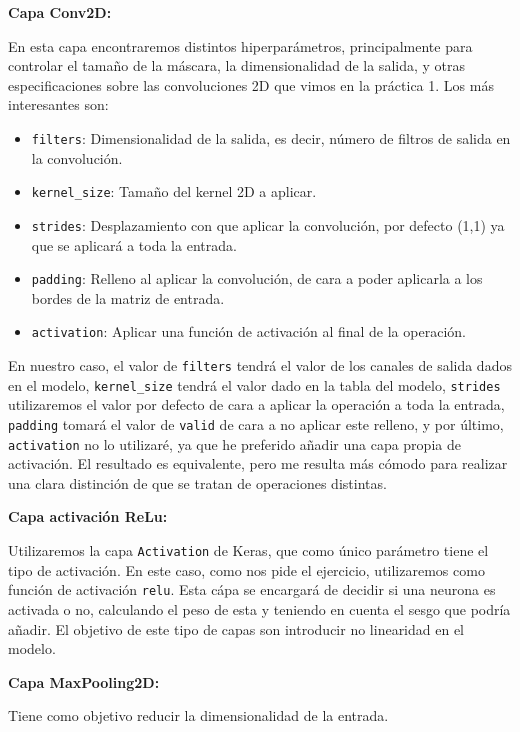 \documentclass[12pt, spanish]{article}
\begin{document}
\textbf{Capa Conv2D:}

En esta capa encontraremos distintos hiperparámetros, principalmente para controlar el tamaño de la máscara, la dimensionalidad de la salida, y otras especificaciones sobre las convoluciones 2D que vimos en la práctica 1. Los más interesantes son:

\begin{itemize}
	\item \texttt{filters}: Dimensionalidad de la salida, es decir, número de filtros de salida en la convolución.
	\item \texttt{kernel\_size}: Tamaño del kernel 2D a aplicar.
	\item \texttt{strides}: Desplazamiento con que aplicar la convolución, por defecto (1,1) ya que se aplicará a toda la entrada.
	\item \texttt{padding}: Relleno al aplicar la convolución, de cara a poder aplicarla a los bordes de la matriz de entrada.
	\item \texttt{activation}: Aplicar una función de activación al final de la operación.

\end{itemize}

En nuestro caso, el valor de \texttt{filters} tendrá el valor de los canales de salida dados en el modelo, \texttt{kernel\_size} tendrá el valor dado en la tabla del modelo, \texttt{strides} utilizaremos el valor por defecto de cara a aplicar la operación a toda la entrada, \texttt{padding} tomará el valor de \texttt{valid} de cara a no aplicar este relleno, y por último, \texttt{activation} no lo utilizaré, ya que he preferido añadir una capa propia de activación. El resultado es equivalente, pero me resulta más cómodo para realizar una clara distinción de que se tratan de operaciones distintas.

\textbf{Capa activación ReLu:}

Utilizaremos la capa \texttt{Activation} de Keras, que como único parámetro tiene el tipo de activación. En este caso, como nos pide el ejercicio, utilizaremos como función de activación \texttt{relu}. Esta cápa se encargará de decidir si una neurona es activada o no, calculando el peso de esta y teniendo en cuenta el sesgo que podría añadir. El objetivo de este tipo de capas son introducir no linearidad en el modelo.

\textbf{Capa MaxPooling2D:}

Tiene como objetivo reducir la dimensionalidad de la entrada.
\end{document}
